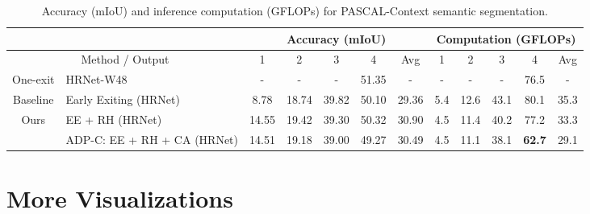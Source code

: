 \setlength{\tabcolsep}{2pt}
\renewcommand{\arraystretch}{1.2}
\begin{table}[h]
\vspace{0ex}
\centering
\footnotesize
\begin{tabular}{c|l|ccccc|ccccc}
\hline
\multicolumn{2}{c|}{}                              & \multicolumn{5}{c}{Accuracy (mIoU)}         & \multicolumn{5}{|c}{Computation (GFLOPs)}            \\ \hline
\multicolumn{2}{c|}{Method / Output}               & 1    & 2    & 3    & 4    & Avg  & 1     & 2     & 3     & 4      & Avg   \\ \hline
 One-exit & HRNet-W48 \cite{wang2020deep}          & -    & -    & -    & 51.35 & -    & -     & -     & -     & 76.5  & -     \\ \hline
\multirow{1}{*}{Baseline} & Early Exiting (HRNet) & 8.78 & 18.74 & 39.82 & 50.10 & 29.36 & 5.4  &12.6 & 43.1 & 80.1  & 35.3 \\
                           \hline
\multirow{2}{*}{Ours}      
                           & EE + RH (HRNet)      & 14.55 & 19.42 & 39.30 & 50.32 & 30.90 & 4.5 & 11.4  & 40.2 & 77.2  & 33.3 \\
                           & ADP-C: EE + RH + CA (HRNet) & 14.51 & 19.18 & 39.00 & 49.27 & 30.49 & 4.5 & 11.1  & 38.1 & \textbf{62.7}  & 29.1 \\ \hline
\end{tabular}
\vspace{0ex}
\caption{%
Accuracy (mIoU) and inference computation (GFLOPs) for PASCAL-Context semantic segmentation. 
}
\vspace{-1ex}
\label{tab:pascal}
\end{table}


\section{More Visualizations}
\label{app:vis}

